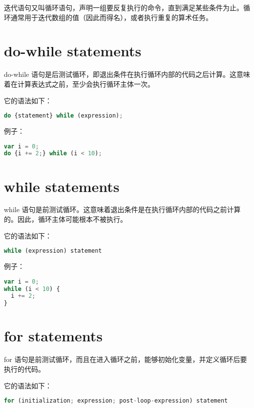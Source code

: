 迭代语句又叫循环语句，声明一组要反复执行的命令，直到满足某些条件为止。循环通常用于迭代数组的值（因此而得名），或者执行重复的算术任务。

\section{do-while statements}

do-while 语句是后测试循环，即退出条件在执行循环内部的代码之后计算。这意味着在计算表达式之前，至少会执行循环主体一次。


它的语法如下：


\begin{lstlisting}[language=JavaScript]
do {statement} while (expression);
\end{lstlisting}

例子：

\begin{lstlisting}[language=JavaScript]
var i = 0;
do {i += 2;} while (i < 10);
\end{lstlisting}




\section{while statements}


while 语句是前测试循环。这意味着退出条件是在执行循环内部的代码之前计算的。因此，循环主体可能根本不被执行。


它的语法如下：

\begin{lstlisting}[language=JavaScript]
while (expression) statement
\end{lstlisting}


例子：

\begin{lstlisting}[language=JavaScript]
var i = 0;
while (i < 10) {
  i += 2;
}
\end{lstlisting}


\section{for statements}


for 语句是前测试循环，而且在进入循环之前，能够初始化变量，并定义循环后要执行的代码。


它的语法如下：

\begin{lstlisting}[language=JavaScript]
for (initialization; expression; post-loop-expression) statement
\end{lstlisting}


